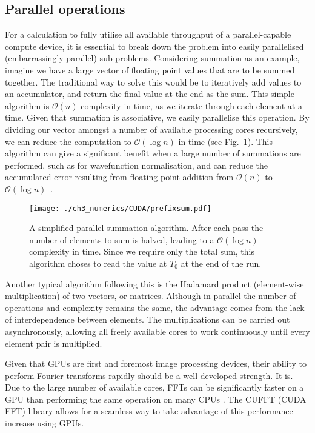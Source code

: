 \subsection{Parallel operations}\label{subsec:par_op}
\label{sub:Parallel operations}
For a calculation to fully utilise all available throughput of a parallel-capable
compute device, it is essential to break down the problem into easily parallelised (embarrassingly parallel) sub-problems. Considering summation as an example, imagine we have a large vector of floating point values that are to be summed together. The traditional way to solve this would be to iteratively add values to an accumulator, and return the final value at the end as the sum. This simple algorithm is $\mathcal{O}(n)$ complexity in time, as we iterate through each element at a time. Given that summation is associative, we easily parallelise this operation. By dividing our vector amongst a number of available processing cores recursively, we can reduce the computation to $\mathcal{O}(\log{} n)$ in time (see Fig.~\ref{fig:prefixsum}). This algorithm can give a significant benefit when a large number of summations are performed, such as for wavefunction normalisation, and can reduce the accumulated error resulting from floating point addition from $\mathcal{O}(n)$ to $\mathcal{O}(\log{} n)$~\cite{}.

\begin{figure}
    \centering
    \texttt{[image: ./ch3\_numerics/CUDA/prefixsum.pdf]}
    \caption{A simplified parallel summation algorithm. After each pass the number of elements to sum is halved, leading to a $\mathcal{O}(\log{} n)$ complexity in time. Since we require only the total sum, this algorithm choses to read the value at $T_0$ at the end of the run.}
    \label{fig:prefixsum}
\end{figure}


Another typical algorithm following this is the Hadamard product (element-wise multiplication) of two vectors, or matrices. Although in parallel the number of operations and complexity remains the same, the advantage comes from the lack of interdependence between elements. The multiplications can be carried out asynchronously, allowing all freely available cores to work continuously until every element pair is multiplied.

Given that GPUs are first and foremost image processing devices, their ability to perform Fourier transforms rapidly should be a well developed strength. It is. Due to the large number of available cores, FFTs can be significantly faster on a GPU than performing the same operation on many CPUs \cite{AO:Morgan_ORiordan_pra_2013}. The CUFFT (CUDA FFT) library allows for a seamless way to take advantage of this performance increase using GPUs.

